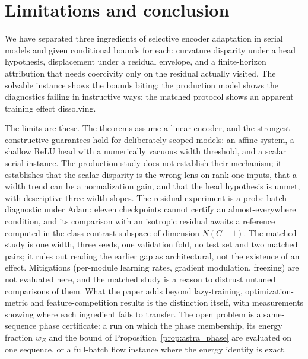 \section{Limitations and conclusion}
\label{sec:limitations}

We have separated three ingredients of selective encoder adaptation in
serial models and given conditional bounds for each: curvature disparity
under a head hypothesis, displacement under a residual envelope, and a
finite-horizon attribution that needs coercivity only on the residual
actually visited. The solvable instance shows the bounds biting; the
production model shows the diagnostics failing in instructive ways; the
matched protocol shows an apparent training effect dissolving.

The limits are these. The theorems assume a linear encoder, and the
strongest constructive guarantees hold for deliberately scoped models: an
affine system, a shallow ReLU head with a numerically vacuous width
threshold, and a scalar serial instance. The production study does not
establish their mechanism; it establishes that the scalar disparity is the
wrong lens on rank-one inputs, that a width trend can be a normalization
gain, and that the head hypothesis is unmet, with descriptive three-width
slopes. The residual experiment is a probe-batch diagnostic under Adam:
eleven checkpoints cannot certify an almost-everywhere condition, and its
comparison with an isotropic residual awaits a reference computed in the
class-contrast subspace of dimension $N(C-1)$. The matched study is one
width, three seeds, one validation fold, no test set and two matched pairs;
it rules out reading the earlier gap as architectural, not the existence of
an effect. Mitigations (per-module learning rates, gradient modulation,
freezing) are not evaluated here, and the matched study is a reason to
distrust untuned comparisons of them. What the paper adds beyond
lazy-training, optimization-metric and feature-competition results is the
distinction itself, with measurements showing where each ingredient fails
to transfer. The open problem is a same-sequence phase certificate: a run on
which the phase membership, its energy fraction $w_E$ and the bound of
Proposition~\ref{prop:astra_phase} are evaluated on one sequence, or a
full-batch flow instance where the energy identity is exact.
